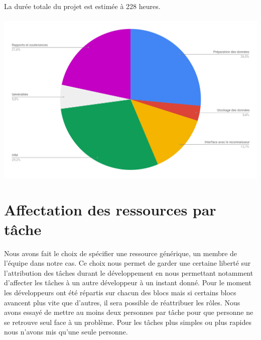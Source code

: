 La durée totale du projet est estimée à 228 heures.

\paragraph{}

\begin{mdframed}[frametitle={Figure 2 : Diagramme de répartition du travail par bloc}, innerbottommargin=10]
\begin{center}
\includegraphics[scale=0.44]{repartition_travail_blocs.pdf}
\end{center}
\end{mdframed}

\section{Affectation des ressources par tâche}

Nous avons fait le choix de spécifier une ressource générique, un membre de l’équipe dans notre cas. Ce choix nous permet de garder une certaine liberté sur l’attribution des tâches durant le développement en nous permettant notamment d’affecter les tâches à un autre développeur à un instant donné. Pour le moment les développeurs ont été répartis sur chacun des blocs mais si certains blocs avancent plus vite que d’autres, il sera possible de réattribuer les rôles. Nous avons essayé de mettre au moins deux personnes par tâche pour que personne ne se retrouve seul face à un problème. Pour les tâches plus simples ou plus rapides nous n'avons mis qu'une seule personne.

\paragraph{}

